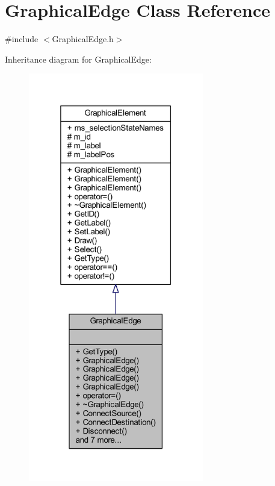 \hypertarget{class_graphical_edge}{}\section{Graphical\+Edge Class Reference}
\label{class_graphical_edge}


{\ttfamily \#include $<$Graphical\+Edge.\+h$>$}



Inheritance diagram for Graphical\+Edge\+:
\nopagebreak
\begin{figure}[H]
\begin{center}
\leavevmode
\includegraphics[width=217pt]{class_graphical_edge__inherit__graph}
\end{center}
\end{figure}


